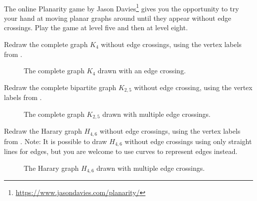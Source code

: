 \begin{act}
\label{act_planarity_puzzle}
~    
    \begin{apart}
        \item The online Planarity game by Jason Davies\footnote{\url{https://www.jasondavies.com/planarity/}} gives you the opportunity to try your hand at moving planar graphs around until they appear without edge crossings.  Play the game at level five and then at level eight.
            
        \item Redraw the complete graph $K_4$ without edge crossings, using the vertex labels from .         
            \begin{figure}[hbtp]
                \centering                 
                
                \caption{The complete graph $K_4$ drawn with an edge crossing.}
                \label{fig_K4_standard}
            \end{figure}
            
        \item Redraw the complete bipartite graph $K_{2,5}$ without edge crossing, using the vertex labels from .
        
            \begin{figure}[hbtp]
                \centering                 
                
                \caption{The complete graph $K_{2,5}$ drawn with multiple edge crossings.}
                \label{fig_K2b5_standard}
            \end{figure}
            
        \item Redraw the Harary graph $H_{4,6}$ without edge crossings, using the vertex labels from .  Note: It is possible to draw $H_{4,6}$ without edge crossings using only straight lines for edges, but you are welcome to use curves to represent edges instead. 
            \begin{figure}[hbtp]
                \centering                 
                
                \caption{The Harary graph $H_{4,6}$ drawn with multiple edge crossings.}
                \label{fig_H4b6_standard}
            \end{figure}
    \end{apart}
\end{act}

\newcommand{\subisograph}{Isomorphic Graphs}
